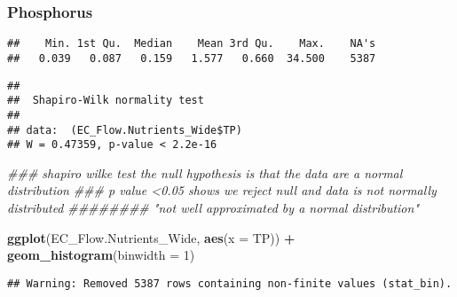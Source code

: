 \documentclass[]{article}
\newenvironment{Shaded}{\begin{snugshade}}{\end{snugshade}}
\newcommand{\CommentTok}[1]{\textcolor[rgb]{0.56,0.35,0.01}{\textit{#1}}}
\newcommand{\DataTypeTok}[1]{\textcolor[rgb]{0.13,0.29,0.53}{#1}}
\newcommand{\DecValTok}[1]{\textcolor[rgb]{0.00,0.00,0.81}{#1}}
\newcommand{\KeywordTok}[1]{\textcolor[rgb]{0.13,0.29,0.53}{\textbf{#1}}}
\newcommand{\NormalTok}[1]{#1}
\newcommand{\OperatorTok}[1]{\textcolor[rgb]{0.81,0.36,0.00}{\textbf{#1}}}
\newcommand{\StringTok}[1]{\textcolor[rgb]{0.31,0.60,0.02}{#1}}
\begin{document}
\hypertarget{phosphorus}{%
\subsubsection{Phosphorus}\label{phosphorus}}

\begin{Shaded}
\end{Shaded}

\begin{verbatim}
##    Min. 1st Qu.  Median    Mean 3rd Qu.    Max.    NA's 
##   0.039   0.087   0.159   1.577   0.660  34.500    5387
\end{verbatim}

\begin{Shaded}
\end{Shaded}

\begin{verbatim}
## 
##  Shapiro-Wilk normality test
## 
## data:  (EC_Flow.Nutrients_Wide$TP)
## W = 0.47359, p-value < 2.2e-16
\end{verbatim}

\begin{Shaded}
\begin{Highlighting}[]
\CommentTok{### shapiro wilke test the null hypothesis is that the data are a normal distribution }
\CommentTok{### p value <0.05 shows we reject null and data is not normally distributed}
\CommentTok{######## "not well approximated by a normal distribution"}

\KeywordTok{ggplot}\NormalTok{(EC_Flow.Nutrients_Wide, }\KeywordTok{aes}\NormalTok{(}\DataTypeTok{x =}\NormalTok{ TP)) }\OperatorTok{+}
\StringTok{  }\KeywordTok{geom_histogram}\NormalTok{(}\DataTypeTok{binwidth =} \DecValTok{1}\NormalTok{) }
\end{Highlighting}
\end{Shaded}

\begin{verbatim}
## Warning: Removed 5387 rows containing non-finite values (stat_bin).
\end{verbatim}
\end{document}
